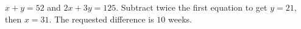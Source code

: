 $x+y=52$ and $2x+3y=125$. Subtract twice the first equation to get $y=21$, then $x=31$. The requested difference is $\boxed{10}$ weeks.
